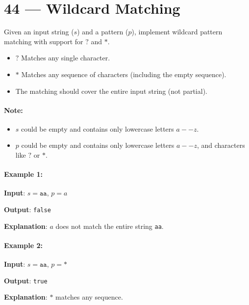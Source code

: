 \section{44 --- Wildcard Matching}
Given an input string ($s$) and a pattern ($p$), implement wildcard pattern matching with support for $?$ and $\ast$.

\begin{itemize}
\item $?$ Matches any single character.
\item $\ast$ Matches any sequence of characters (including the empty sequence).
\item The matching should cover the entire input string (not partial).
\end{itemize}

\paragraph{Note:}

\begin{itemize}
\item $s$ could be empty and contains only lowercase letters $a--z$.
\item $p$ could be empty and contains only lowercase letters $a--z$, and characters like $?$ or $\ast$.
\end{itemize}

\paragraph{Example 1:}

\begin{flushleft}
\textbf{Input}: $s = \texttt{aa}$, $p = a$

\textbf{Output}: \texttt{false}

\textbf{Explanation}: $a$ does not match the entire string \texttt{aa}.
\end{flushleft}

\paragraph{Example 2:}

\begin{flushleft}
\textbf{Input}: $s = \texttt{aa}$, $p = \ast$

\textbf{Output}: \texttt{true}

\textbf{Explanation}: $\ast$ matches any sequence.
\end{flushleft}


